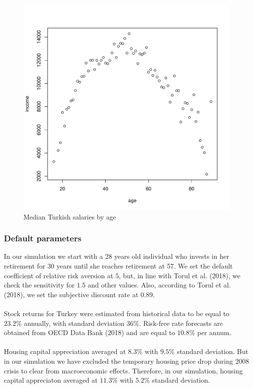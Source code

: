 \documentclass[]{elsarticle}
\begin{document}
\begin{figure}[h]
	\centering
	\includegraphics[scale=0.6]{figs/wage2median.pdf}
	\caption{Median Turkish salaries by age}
\end{figure}

\subsubsection{Default parameters}
In our simulation we start with a 28 years old individual who invests in her retirement for 30 years until she reaches retirement at 57. We set the default coefficient of relative risk aversion at $5$, but, in line with Torul et al. (2018), we check the sensitivity for $1.5$ and other values. Also, according to Torul et al. (2018), we set the subjective discount rate at $0.89$.

\paragraph{}Stock returns for Turkey were estimated from historical data to be equal to $23.2\%$ annually, with standard deviation $36\%$. Risk-free rate forecasts are obtained from OECD Data Bank (2018) and are equal to $10.8\%$ per annum.

\paragraph{}Housing capital appreciation averaged at $8.3\%$ with $9.5\%$ standard deviation. But in our simulation we have excluded the temporary housing price drop during 2008 crisis to clear from macroeconomic effects. Therefore, in our simulation, housing capital appreciaton averaged at $11.3\%$ with $5.2\%$ standard deviation.
\end{document}
